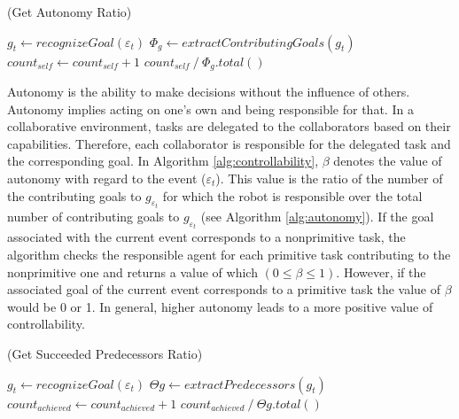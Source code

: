 \documentclass{aamas2016}
\begin{document}
\renewcommand\thealgorithm{4\alph{algorithm}}
\setcounter{algorithm}{1}

\begin{algorithm}
	\caption{(Get Autonomy Ratio)}
	\label{alg:autonomy}
	\begin{algorithmic}[1]
			\Statex
			\State $\mathit{g}_{t} \gets \textit{recognizeGoal}{(\varepsilon_t)}$
			\Statex
			\State $\Phi_{\mathit{g}} \gets
			\textit{extractContributingGoals}{(\mathit{g}_{t})}$
			\Statex
					\State $count_{self} \gets count_{self} + 1$
				\EndIf
			\EndFor
			\Statex
			\State \Return 
			${count_{self} \mathbin{/} {{\Phi_{\mathit{g}}}.total()}}$
		\EndFunction 
	\end{algorithmic}
\end{algorithm}

\vspace*{-3mm}
Autonomy is the ability to make decisions without the influence of others.
Autonomy implies acting on one's own and being responsible for that. In a
collaborative environment, tasks are delegated to the collaborators based on
their capabilities. Therefore, each collaborator is responsible for the
delegated task and the corresponding goal. In Algorithm
\ref{alg:controllability}, $\beta$ denotes the value of autonomy with regard to
the event ($\varepsilon_t$). This value is the ratio of the number of the
contributing goals to $\mathit{g}_{\varepsilon_t}$ for which the robot is
responsible over the total number of contributing goals to
$\mathit{g}_{\varepsilon_t}$ (see Algorithm \ref{alg:autonomy}). If the
goal associated with the current event corresponds to a nonprimitive task, the
algorithm checks the responsible agent for each primitive task contributing to
the nonprimitive one and returns a value of which $(0 \leq \beta \leq 1)$.
However, if the associated goal of the current event corresponds to a primitive
task the value of $\beta$ would be 0 or 1. In general, higher autonomy leads to
a more positive value of controllability.

\renewcommand\thealgorithm{4\alph{algorithm}}
\setcounter{algorithm}{2}

\begin{algorithm}
	\caption{(Get Succeeded Predecessors Ratio)}
	\label{alg:predecessors}
	\begin{algorithmic}[1]
			\Statex
			\State $\mathit{g}_{t} \gets \textit{recognizeGoal}{(\varepsilon_t)}$
			\Statex
			\State $\Theta{\mathit{g}} \gets
			\textit{extractPredecessors}{(\mathit{g}_{t})}$
			\Statex
					\State $count_{achieved} \gets count_{achieved} + 1$
				\EndIf
			\EndFor
			\Statex
			\State \Return
			${count_{achieved} \mathbin{/} {\Theta{\mathit{g}}.total()}}$
		\EndFunction 
	\end{algorithmic}
\end{algorithm}
\end{document}
